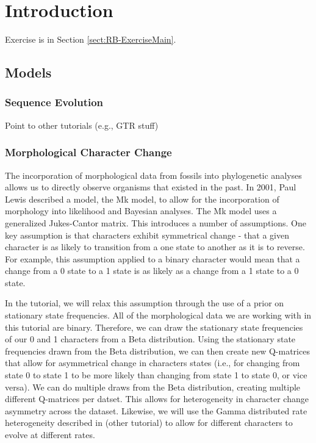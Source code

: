
\section{Introduction}

\citet{Ronquist2012a} 

Exercise is in Section \ref{sect:RB-ExerciseMain}.

\subsection{Models}

\subsubsection{Sequence Evolution}

Point to other tutorials (e.g., GTR stuff) 

\subsubsection{Morphological Character Change}

The incorporation of morphological data from fossils into phylogenetic analyses allows us to directly observe organisms that existed in the past.
In 2001, Paul Lewis described a model, the Mk model, to allow for the incorporation of morphology into likelihood and Bayesian analyses.
The Mk model uses a generalized Jukes-Cantor matrix.
This introduces a number of assumptions. 
One key assumption is that characters exhibit symmetrical change - that a given character is as likely to transition from a one state to another as it is to reverse.
For example, this assumption applied to a binary character would mean that a change from a 0 state to a 1 state is as likely as a change from a 1 state to a 0 state. \par
In the tutorial, we will relax this assumption through the use of a prior on stationary state frequencies. 
All of the morphological data we are working with in this tutorial are binary.  
Therefore, we can draw the stationary state frequencies of our 0 and 1 characters from a Beta distribution. 
Using the stationary state frequencies drawn from the Beta distribution, we can then create new Q-matrices that allow for asymmetrical change in characters states (i.e., for changing from state 0 to state 1 to be more likely than changing from state 1 to state 0, or vice versa). 
We can do multiple draws from the Beta distribution, creating multiple different Q-matrices per datset.
This allows for heterogeneity in character change asymmetry across the dataset. 
Likewise, we will use the Gamma distributed rate heterogeneity described in (other tutorial) to allow for different characters to evolve at different rates.\par

